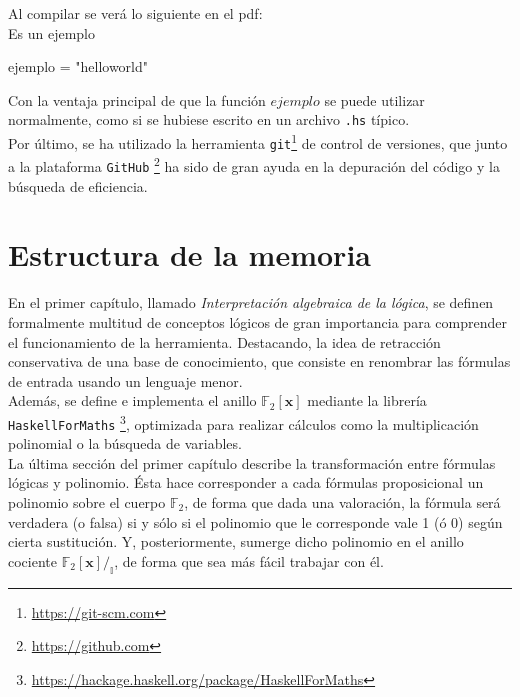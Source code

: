 Al compilar se verá lo siguiente en el pdf:\\

Es un ejemplo
\begin{code}
ejemplo = "helloworld"
\end{code}

Con la ventaja principal de que la función $ejemplo$ se puede utilizar normalmente, como si se hubiese escrito en un archivo \texttt{.hs} típico.\\

Por último, se ha utilizado la herramienta \texttt{git}\footnote{\url{https://git-scm.com}} de control de versiones, que junto a la plataforma \texttt{GitHub} \footnote{\url{https://github.com}} ha sido de gran ayuda en la depuración del código y la búsqueda de eficiencia.


\section{Estructura de la memoria}


En el primer capítulo, llamado \textit{Interpretación algebraica de la lógica}, se definen formalmente multitud de conceptos lógicos de gran importancia para comprender el funcionamiento de la herramienta. Destacando, la idea de retracción conservativa de una base de conocimiento, que consiste en renombrar las fórmulas de entrada usando un lenguaje menor.\\ 

Además, se define e implementa el anillo $\mathbb{F}_2[\textbf{x}]$ mediante la librería \texttt{HaskellForMaths} \footnote{\url{https://hackage.haskell.org/package/HaskellForMaths}}, optimizada para realizar cálculos como la multiplicación polinomial o la búsqueda de variables.\\ 

La última sección del primer capítulo describe la transformación entre fórmulas lógicas y polinomio. Ésta hace corresponder a cada fórmulas proposicional un polinomio sobre el cuerpo $\mathbb{F}_2$, de forma que dada una valoración, la fórmula será verdadera (o falsa) si y sólo si el polinomio que le corresponde vale 1 (ó 0) según cierta sustitución. Y, posteriormente, sumerge dicho polinomio en el anillo cociente $\mathbb{F}_2[\textbf{x}] /_{\mathbb{I}}$, de forma que sea más fácil trabajar con él.\\

